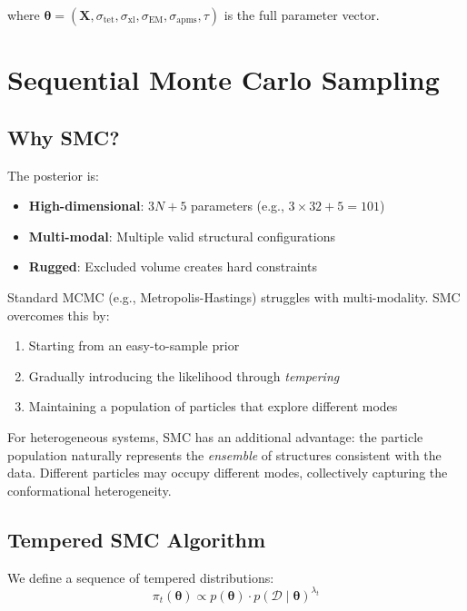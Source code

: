 \documentclass[11pt,a4paper]{article}
\newcommand{\btheta}{\boldsymbol{\theta}}
\newcommand{\bX}{\mathbf{X}}
\theoremstyle{definition}
\begin{document}
where $\btheta = (\bX, \sigma_{\text{tet}}, \sigma_{\text{xl}}, \sigma_{\text{EM}}, \sigma_{\text{apms}}, \tau)$ is the full parameter vector.

\section{Sequential Monte Carlo Sampling}

\subsection{Why SMC?}

The posterior is:
\begin{itemize}
    \item \textbf{High-dimensional}: $3N + 5$ parameters (e.g., $3 \times 32 + 5 = 101$)
    \item \textbf{Multi-modal}: Multiple valid structural configurations
    \item \textbf{Rugged}: Excluded volume creates hard constraints
\end{itemize}

Standard MCMC (e.g., Metropolis-Hastings) struggles with multi-modality. SMC overcomes this by:
\begin{enumerate}
    \item Starting from an easy-to-sample prior
    \item Gradually introducing the likelihood through \textit{tempering}
    \item Maintaining a population of particles that explore different modes
\end{enumerate}

For heterogeneous systems, SMC has an additional advantage: the particle population naturally represents the \textit{ensemble} of structures consistent with the data. Different particles may occupy different modes, collectively capturing the conformational heterogeneity.

\subsection{Tempered SMC Algorithm}

We define a sequence of tempered distributions:
\begin{equation}
    \pi_t(\btheta) \propto p(\btheta) \cdot p(\mathcal{D} \mid \btheta)^{\lambda_t}
\end{equation}
\end{document}
